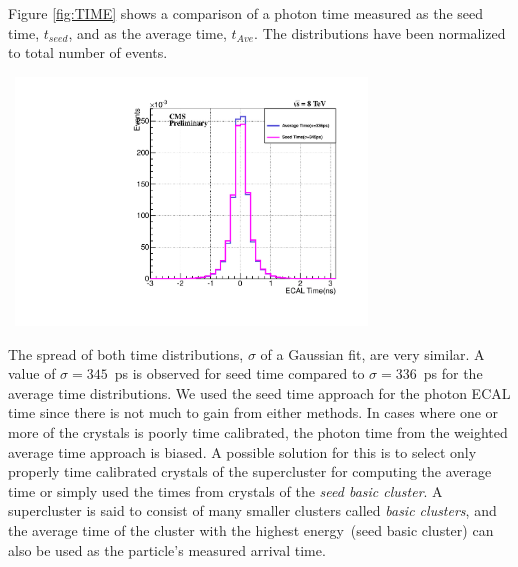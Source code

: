 Figure \ref{fig:TIME} shows a comparison of a photon time measured as the seed time, $t_{seed}$, and as the average time, $t_{Ave}$. The distributions have been normalized to total number of events.

\vspace{5mm}
\begin{minipage}{0.90\linewidth} 
\begin{center}
\mbox{
\includegraphics[height=0.50\textwidth, width=0.7\textwidth]{THESISPLOTS/ECAL-SeedVsAveTime-Zee.pdf}
}
\label{fig:TIME}
\end{center}
\end{minipage}

\vspace{5mm}
The spread of both time distributions, $\sigma$ of a Gaussian fit, are very similar. A value of  $\sigma = 345$~ps is observed for seed time compared to $\sigma = 336$~ps for the average time distributions. We used the seed time approach for the photon ECAL time since there is not much to gain from either methods.  \newline
In cases where one or more of the crystals is poorly time calibrated, the photon time from the weighted average time approach is biased. A possible solution for this is to select only properly time calibrated crystals of the supercluster for computing the average time or simply used the times from crystals of the \textit{seed basic cluster}. A supercluster is said to consist of many smaller clusters called \textit{basic clusters}, and the average time of the cluster with the highest energy~(seed basic cluster) can also be used as the particle's measured arrival time.
